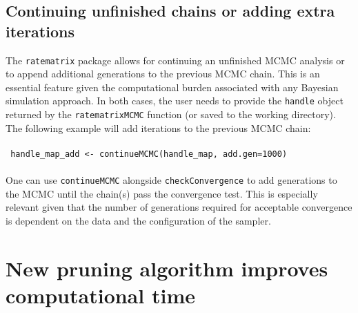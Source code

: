 \subsection{ Continuing unfinished chains or adding extra iterations }

The \texttt{ratematrix} package allows for continuing an unfinished MCMC analysis or to append additional generations to the previous MCMC chain. This is an essential feature given the computational burden associated with any Bayesian simulation approach. In both cases, the user needs to provide the \texttt{handle} object returned by the \texttt{ratematrixMCMC} function (or saved to the working directory). The following example will add iterations to the previous MCMC chain: \\
\\
\hspace*{20pt} \texttt{ handle\_map\_add <- continueMCMC(handle\_map, add.gen=1000) }\\
\\
One can use \texttt{continueMCMC} alongside \texttt{checkConvergence} to add generations to the MCMC until the chain(s) pass the convergence test. This is especially relevant given that the number of generations required for acceptable convergence is dependent on the data and the configuration of the sampler.

\section{ New pruning algorithm improves computational time }

